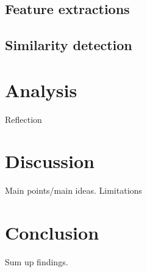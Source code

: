 \documentclass[english]{tktltiki2}
\theoremstyle{definition}
\theoremstyle{remark}
\begin{document}
\subsection{Feature extractions}

\subsection{Similarity detection}


\section{Analysis}
Reflection
\section{Discussion}

Main points/main ideas. Limitations

\section{Conclusion}

Sum up findings.


%
%
%
%







% 
\end{document}
